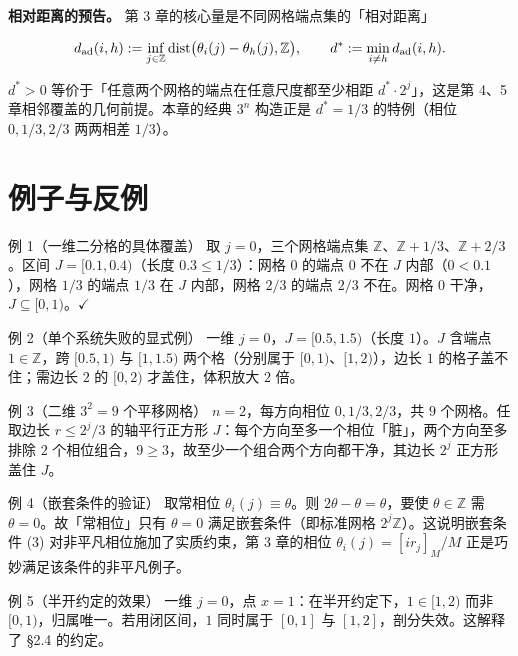 \documentclass[a4paper,11pt,openany]{ctexbook}
\numberwithin{equation}{chapter}
\numberwithin{figure}{chapter}
\numberwithin{table}{chapter}
\begin{document}
\textbf{相对距离的预告。} 第 3 章的核心量是不同网格端点集的「相对距离」

$$d_{\rm ad}(i,h):=\inf_{j\in\mathbb Z}\operatorname{dist}\bigl(\theta_i(j)-\theta_h(j),\mathbb Z\bigr),\qquad d^*:=\min_{i\neq h}d_{\rm ad}(i,h).$$

$d^*>0$ 等价于「任意两个网格的端点在任意尺度都至少相距 $d^*\cdot 2^j$」，这是第 4、5 章相邻覆盖的几何前提。本章的经典 $3^n$ 构造正是 $d^*=1/3$ 的特例（相位 $0,1/3,2/3$ 两两相差 $1/3$）。

\section{例子与反例}

\begin{examplebox}{例 1（一维二分格的具体覆盖）}
取 $j=0$，三个网格端点集 $\mathbb Z$、$\mathbb Z+1/3$、$\mathbb Z+2/3$。区间 $J=[0.1,0.4)$（长度 $0.3\le 1/3$）：网格 $0$ 的端点 $0$ 不在 $J$ 内部（$0<0.1$），网格 $1/3$ 的端点 $1/3$ 在 $J$ 内部，网格 $2/3$ 的端点 $2/3$ 不在。网格 $0$ 干净，$J\subseteq[0,1)$。$\checkmark$
\end{examplebox}

\begin{examplebox}{例 2（单个系统失败的显式例）}
一维 $j=0$，$J=[0.5,1.5)$（长度 $1$）。$J$ 含端点 $1\in\mathbb Z$，跨 $[0.5,1)$ 与 $[1,1.5)$ 两个格（分别属于 $[0,1)$、$[1,2)$），边长 $1$ 的格子盖不住；需边长 $2$ 的 $[0,2)$ 才盖住，体积放大 $2$ 倍。
\end{examplebox}

\begin{examplebox}{例 3（二维 $3^2=9$ 个平移网格）}
$n=2$，每方向相位 $0,1/3,2/3$，共 $9$ 个网格。任取边长 $r\le 2^j/3$ 的轴平行正方形 $J$：每个方向至多一个相位「脏」，两个方向至多排除 $2$ 个相位组合，$9\ge 3$，故至少一个组合两个方向都干净，其边长 $2^j$ 正方形盖住 $J$。
\end{examplebox}

\begin{examplebox}{例 4（嵌套条件的验证）}
取常相位 $\theta_i(j)\equiv\theta$。则 $2\theta-\theta=\theta$，要使 $\theta\in\mathbb Z$ 需 $\theta=0$。故「常相位」只有 $\theta=0$ 满足嵌套条件（即标准网格 $2^j\mathbb Z$）。这说明嵌套条件 (3) 对非平凡相位施加了实质约束，第 3 章的相位 $\theta_i(j)=[ir_j]_M/M$ 正是巧妙满足该条件的非平凡例子。
\end{examplebox}

\begin{examplebox}{例 5（半开约定的效果）}
一维 $j=0$，点 $x=1$：在半开约定下，$1\in[1,2)$ 而非 $[0,1)$，归属唯一。若用闭区间，$1$ 同时属于 $[0,1]$ 与 $[1,2]$，剖分失效。这解释了 §2.4 的约定。
\end{examplebox}
\end{document}
